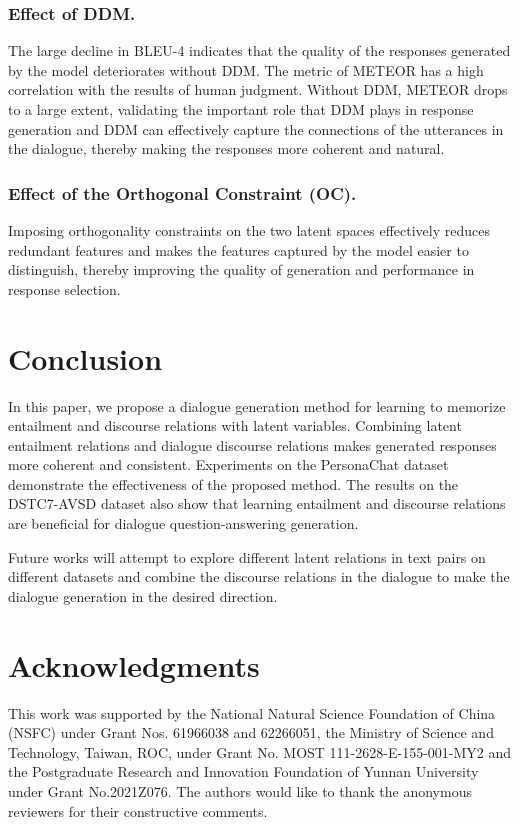 \documentclass[letterpaper]{article} \usepackage{aaai23}  \usepackage{times}  \usepackage{helvet}  \usepackage{courier}  \usepackage[hyphens]{url}  \usepackage{graphicx} \urlstyle{rm} \def\UrlFont{\rm}  \usepackage{natbib}  \usepackage{caption} \frenchspacing  \setlength{\pdfpagewidth}{8.5in}  \setlength{\pdfpageheight}{11in}  \usepackage{algorithm}
\begin{document}
\subsubsection{Effect of DDM.}
The large decline in BLEU-4 indicates that the quality of the responses generated by the model deteriorates without DDM. The metric of METEOR has a high correlation with the results of human judgment. Without DDM, METEOR drops to a large extent, validating the important role that DDM plays in response generation and DDM can effectively capture the connections of the utterances in the dialogue, thereby making the responses more coherent and natural.

\subsubsection{Effect of the Orthogonal Constraint (OC).}
Imposing orthogonality constraints on the two latent spaces effectively reduces redundant features and makes the features captured by the model easier to distinguish, thereby improving the quality of generation and performance in response selection.

\section{Conclusion}
In this paper, we propose a dialogue generation method for learning to memorize entailment and discourse relations with latent variables. Combining latent entailment relations and dialogue discourse relations makes generated responses more coherent and consistent. Experiments on the PersonaChat dataset demonstrate the effectiveness of the proposed method. The results on the DSTC7-AVSD dataset also show that learning entailment and discourse relations are beneficial for dialogue question-answering generation. 

Future works will attempt to explore different latent relations in text pairs on different datasets and combine the discourse relations in the dialogue to make the dialogue generation in the desired direction.

\section*{Acknowledgments}
This work was supported by the National Natural Science Foundation of China (NSFC) under Grant Nos. 61966038 and 62266051, the Ministry of Science and Technology, Taiwan, ROC, under Grant No. MOST 111-2628-E-155-001-MY2 and the Postgraduate Research and Innovation Foundation of Yunnan University under Grant No.2021Z076. The authors would like to thank the anonymous reviewers for their constructive comments.
\end{document}

